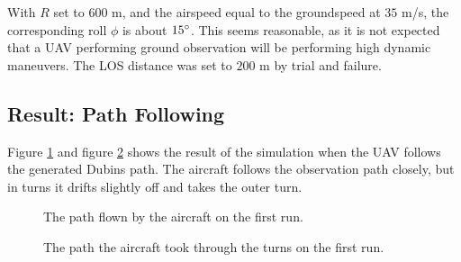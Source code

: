 With $R$ set to $600$ m, and the airspeed equal to the groundspeed at $35$ m/s, the corresponding roll $\phi$ is about $15\degree$. This seems reasonable, as it is not expected that a UAV performing ground observation will be performing high dynamic maneuvers. The LOS distance was set to $200$ m by trial and failure.


\subsection{Result: Path Following}

Figure \ref{fig:first_run_path} and figure \ref{fig:first_run_turns} shows the result of the simulation when the UAV follows the generated Dubins path. The aircraft follows the observation path closely, but in turns it drifts slightly off and takes the outer turn. 

\begin{figure}[]
    \centering
    \caption{The path flown by the aircraft on the first run.}
	\label{fig:first_run_path}
\end{figure}

\begin{figure}[]
    \centering
    \caption{The path the aircraft took through the turns on the first run.}
	\label{fig:first_run_turns}
\end{figure}


